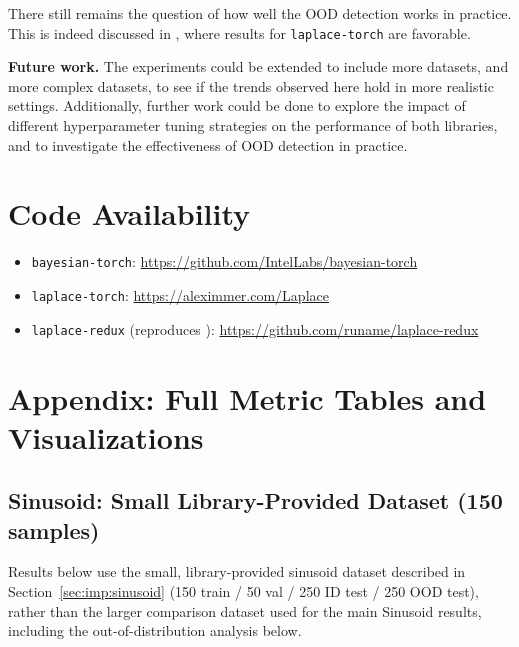 \documentclass[conference]{IEEEtran}
\begin{document}
There still remains the question of how well the OOD detection works in practice. This is
indeed discussed in \citet{daxberger2021laplace}, where results for \texttt{laplace-torch}
are favorable.

\textbf{Future work.} The experiments could be extended to include more datasets, and more
complex datasets, to see if the trends observed here hold in more realistic settings.
Additionally, further work could be done to explore the impact of different hyperparameter
tuning strategies on the performance of both libraries, and to investigate the
effectiveness of OOD detection in practice.

\section{Code Availability}
\label{sec:software}

\begin{itemize}[leftmargin=*]
	\item \texttt{bayesian-torch}:
	      \url{https://github.com/IntelLabs/bayesian-torch}
	\item \texttt{laplace-torch}:
	      \url{https://aleximmer.com/Laplace}
	\item \texttt{laplace-redux} (reproduces \citet{daxberger2021laplace}):
	      \url{https://github.com/runame/laplace-redux}
\end{itemize}

\appendix
\section{Appendix: Full Metric Tables and Visualizations}
\label{sec:app}

\subsection{Sinusoid: Small Library-Provided Dataset (150 samples)}
\label{sec:app:sinusoid_small}

Results below use the small, library-provided sinusoid dataset described in
Section~\ref{sec:imp:sinusoid} (150 train / 50 val / 250 ID test / 250 OOD test), rather
than the larger comparison dataset used for the main Sinusoid results, including the
out-of-distribution analysis below.
\end{document}
